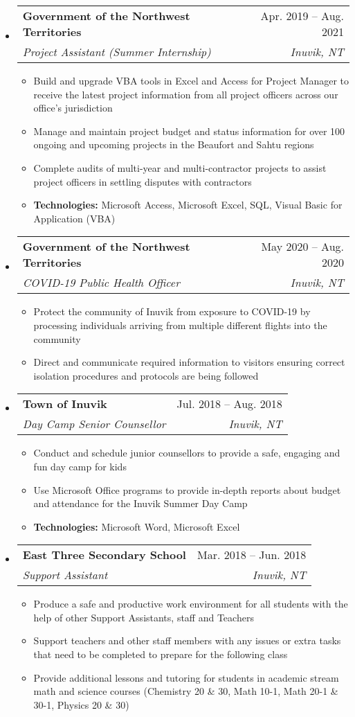 \documentclass[letterpaper,12pt]{article}[leftmargin=*]
\makeatletter
\def \entryspacing {-0pt}
\newcommand{\resumeEntryStart}{\begin{itemize}[leftmargin=2.5mm]}
\newcommand{\resumeEntryEnd}{\end{itemize}\vspace{\entryspacing}}
\newcommand{\resumeItemListStart}{\begin{itemize}[leftmargin=4.5mm]}
\newcommand{\resumeItemListEnd}{\end{itemize}}
\newcommand{\resumeItem}[1]{
  \item\small{
    {#1 \vspace{-2pt}}
  }
}
\newcommand{\resumeEntryTSDL}[4]{
  \vspace{-1pt}\item[]
    \begin{tabularx}{0.97\textwidth}{X@{\hspace{60pt}}r}
      \textbf{\color{primary}#1} & {\firabook\color{accent}\small#2} \\
      \textit{\color{accent}\small#3} & \textit{\color{accent}\small#4} \\
    \end{tabularx}\vspace{-6pt}
}
\makeatother
\begin{document}
  \resumeEntryStart
    \resumeEntryTSDL
      {Government of the Northwest Territories}{Apr. 2019 -- Aug. 2021}
      {Project Assistant (Summer Internship)}{Inuvik, NT}
    \resumeItemListStart
      \resumeItem {Build and upgrade VBA tools in Excel and Access for Project Manager to receive the latest
      project information from all project officers across our office's jurisdiction}
      \resumeItem {Manage and maintain project budget and status information for over 100 ongoing and upcoming projects in the Beaufort 
      and Sahtu regions}
      \resumeItem {Complete audits of multi-year and multi-contractor projects to assist project officers in settling disputes with contractors}
      \resumeItem{\textbf{Technologies:} Microsoft Access, Microsoft Excel, SQL, Visual Basic for Application (VBA)}
    \resumeItemListEnd
  \resumeEntryEnd

  \resumeEntryStart
  \resumeEntryTSDL
    {Government of the Northwest Territories}{May 2020 -- Aug. 2020}
    {COVID-19 Public Health Officer}{Inuvik, NT}
  \resumeItemListStart
    \resumeItem {Protect the community of Inuvik from exposure to COVID-19 by processing individuals arriving from multiple different
    flights into the community}
    \resumeItem {Direct and communicate required information to visitors ensuring correct isolation procedures and protocols are 
    being followed}
  \resumeItemListEnd
\resumeEntryEnd

\resumeEntryStart
\resumeEntryTSDL
  {Town of Inuvik}{Jul. 2018 -- Aug. 2018}
  {Day Camp Senior Counsellor}{Inuvik, NT}
\resumeItemListStart
  \resumeItem {Conduct and schedule junior counsellors to provide a safe, engaging and fun day camp for kids}
  \resumeItem {Use Microsoft Office programs to provide in-depth reports about budget and attendance for the Inuvik Summer Day Camp}
  \resumeItem {\textbf{Technologies:} Microsoft Word, Microsoft Excel}
\resumeItemListEnd
\resumeEntryEnd

\resumeEntryStart
\resumeEntryTSDL
  {East Three Secondary School}{Mar. 2018 -- Jun. 2018}
  {Support Assistant}{Inuvik, NT}
\resumeItemListStart
  \resumeItem {Produce a safe and productive work environment for all students with the help of other Support Assistants, staff and Teachers}
  \resumeItem {Support teachers and other staff members with any issues or extra tasks that need to be completed to prepare for the
  following class}
  \resumeItem {Provide additional lessons and tutoring for students in academic stream math and science courses (Chemistry 20 \& 30, Math 10-1, Math 20-1 \& 30-1, Physics 20 \& 30)}
\resumeItemListEnd
\resumeEntryEnd
\end{document}

